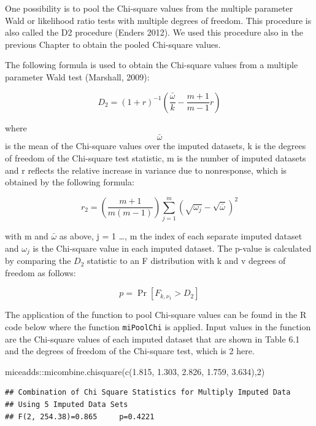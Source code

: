 \documentclass[
]{book}
\newenvironment{Shaded}{\begin{snugshade}}{\end{snugshade}}
\newcommand{\DecValTok}[1]{\textcolor[rgb]{0.00,0.00,0.81}{#1}}
\newcommand{\FloatTok}[1]{\textcolor[rgb]{0.00,0.00,0.81}{#1}}
\newcommand{\FunctionTok}[1]{\textcolor[rgb]{0.00,0.00,0.00}{#1}}
\newcommand{\NormalTok}[1]{#1}
\newcommand{\SpecialCharTok}[1]{\textcolor[rgb]{0.00,0.00,0.00}{#1}}
\begin{document}
One possibility is to pool the Chi-square values from the multiple parameter Wald or likelihood ratio tests with multiple degrees of freedom. This procedure is also called the D2 procedure (Enders 2012). We used this procedure also in the previous Chapter to obtain the pooled Chi-square values.

The following formula is used to obtain the Chi-square values from a multiple parameter Wald test (Marshall, 2009):

\begin{equation}
 D_2 = (1+r)^{-1} (\frac{ \bar\omega}{k}-\frac{ m+1}{m-1}r)
  \label{eq:d2}
\end{equation}

where \[\bar\omega\] is the mean of the Chi-square values over the imputed datasets, k is the degrees of freedom of the Chi-square test statistic, m is the number of imputed datasets and r reflects the relative increase in variance due to nonresponse, which is obtained by the following formula:

\[r_2 = \left(\frac{m+1}{m(m-1)}\right)\sum_{j=1}^m\left(\sqrt{\omega_j}-{\sqrt{\bar\omega}}\right)^2\]

with m and \(\bar\omega\) as above, j = 1 \ldots, m the index of each separate imputed dataset and \(\omega_j\) is the Chi-square value in each imputed dataset. The p-value is calculated by comparing the \(D_2\) statistic to an F distribution with k and v degrees of freedom as follows:

\[p = \Pr[F_{k,\nu_1}>D_2]\]

The application of the function to pool Chi-square values can be found in the R code below where the function \texttt{miPoolChi} is applied. Input values in the function are the Chi-square values of each imputed dataset that are shown in Table 6.1 and the degrees of freedom of the Chi-square test, which is 2 here.

\begin{Shaded}
\begin{Highlighting}[]
\NormalTok{miceadds}\SpecialCharTok{::}\FunctionTok{micombine.chisquare}\NormalTok{(}\FunctionTok{c}\NormalTok{(}\FloatTok{1.815}\NormalTok{,}
            \FloatTok{1.303}\NormalTok{,}
            \FloatTok{2.826}\NormalTok{,}
            \FloatTok{1.759}\NormalTok{,}
            \FloatTok{3.634}\NormalTok{),}\DecValTok{2}\NormalTok{)}
\end{Highlighting}
\end{Shaded}

\begin{verbatim}
## Combination of Chi Square Statistics for Multiply Imputed Data
## Using 5 Imputed Data Sets
## F(2, 254.38)=0.865     p=0.4221
\end{verbatim}
\end{document}
